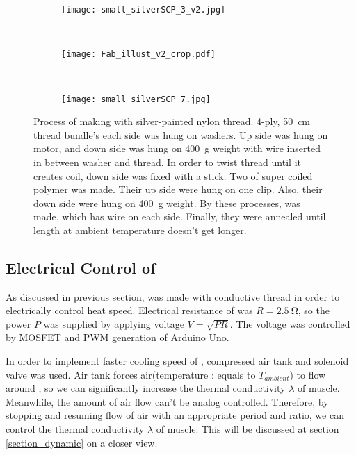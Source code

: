 \begin{figure}
	\centering
	\begin{subfigure}{.15\linewidth}
		\centering\texttt{[image: small\_silverSCP\_3\_v2.jpg]}
		\caption{\label{silverSCP_2}}
	\end{subfigure}
	~
	\begin{subfigure}{.45\linewidth}
		\centering\texttt{[image: Fab\_illust\_v2\_crop.pdf]}
		\caption{\label{silverSCP_illust}}
	\end{subfigure}
	~
	\begin{subfigure}{.15\linewidth}
		\centering\texttt{[image: small\_silverSCP\_7.jpg]}
		\caption{\label{silverSCP_annealing}}
	\end{subfigure}
	\caption[Process of making \scp with silver-painted nylon thread]{Process of making \scp with silver-painted nylon thread.   4-ply, \SI{50}{\centi\meter} thread bundle's each side was hung on washers. Up side was hung on motor, and down side was hung on \SI{400}{\gram} weight with wire inserted in between washer and thread.  In order to twist thread until it creates coil, down side was fixed with a stick. Two of super coiled polymer was made. Their up side were hung on one clip. Also, their down side were hung on \SI{400}{\gram} weight.  By these processes, \scp was made, which has wire on each side. Finally, they were annealed until length at ambient temperature doesn't get longer.}
	\label{silverSCP_makingof}
\end{figure}

\subsection{Electrical Control of \SCP}\label{section_electrical_control}
As discussed in previous section, \scp was made with conductive thread in order to electrically control heat speed. Electrical resistance of \scp was $R=\SI{2.5}{\ohm}$, so the power $P$ was supplied by applying voltage $V=\sqrt{PR}$. The voltage was controlled by MOSFET and PWM generation of Arduino Uno.

In order to implement faster cooling speed of \scp, compressed air tank and solenoid valve was used. Air tank forces air(temperature : equals to  $T_{ambient}$) to flow around \scp, so we can significantly increase the thermal conductivity $\lambda$ of muscle. Meanwhile, the amount of air flow can't be analog controlled. Therefore, by stopping and resuming flow of air with an appropriate period and ratio, we can control the thermal conductivity $\lambda$ of muscle. This will be discussed at section \ref{section_dynamic} on a closer view.

